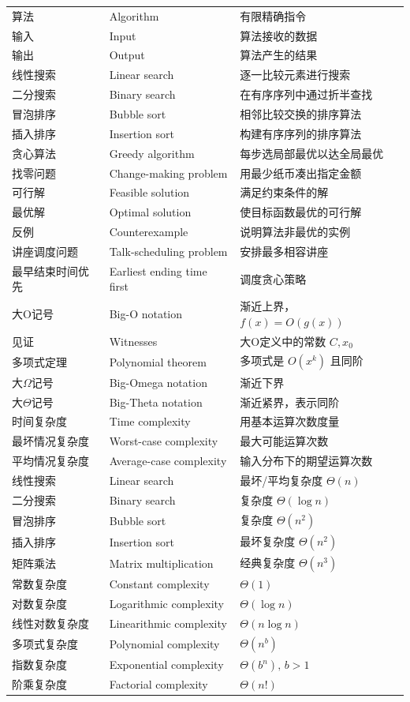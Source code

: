 \documentclass[UTF8,11pt,a4paper]{ctexbook}   %
\theoremstyle{definition}
\begin{document}
\begin{longtable}{|p{4.8cm}|p{4.8cm}|p{4.8cm}|}
算法 & Algorithm & 有限精确指令 \\
输入 & Input & 算法接收的数据 \\
输出 & Output & 算法产生的结果 \\
线性搜索 & Linear search & 逐一比较元素进行搜索 \\
二分搜索 & Binary search & 在有序序列中通过折半查找 \\
冒泡排序 & Bubble sort & 相邻比较交换的排序算法 \\
插入排序 & Insertion sort & 构建有序序列的排序算法 \\
贪心算法 & Greedy algorithm & 每步选局部最优以达全局最优 \\
找零问题 & Change-making problem & 用最少纸币凑出指定金额 \\
可行解 & Feasible solution & 满足约束条件的解 \\
最优解 & Optimal solution & 使目标函数最优的可行解 \\
反例 & Counterexample & 说明算法非最优的实例 \\
讲座调度问题 & Talk-scheduling problem & 安排最多相容讲座 \\
最早结束时间优先 & Earliest ending time first & 调度贪心策略 \\
\hline
大O记号 & Big-O notation & 渐近上界，$f(x)=O(g(x))$ \\
见证 & Witnesses & 大O定义中的常数 $C,x_0$ \\
多项式定理 & Polynomial theorem & 多项式是 $O(x^k)$ 且同阶 \\
大$\Omega$记号 & Big-Omega notation & 渐近下界 \\
大$\Theta$记号 & Big-Theta notation & 渐近紧界，表示同阶 \\
时间复杂度 & Time complexity & 用基本运算次数度量 \\
最坏情况复杂度 & Worst-case complexity & 最大可能运算次数 \\
平均情况复杂度 & Average-case complexity & 输入分布下的期望运算次数 \\
线性搜索 & Linear search & 最坏/平均复杂度 $\Theta(n)$ \\
二分搜索 & Binary search & 复杂度 $\Theta(\log n)$ \\
冒泡排序 & Bubble sort & 复杂度 $\Theta(n^2)$ \\
插入排序 & Insertion sort & 最坏复杂度 $\Theta(n^2)$ \\
矩阵乘法 & Matrix multiplication & 经典复杂度 $\Theta(n^3)$ \\
常数复杂度 & Constant complexity & $\Theta(1)$ \\
对数复杂度 & Logarithmic complexity & $\Theta(\log n)$ \\
线性对数复杂度 & Linearithmic complexity & $\Theta(n \log n)$ \\
多项式复杂度 & Polynomial complexity & $\Theta(n^b)$ \\
指数复杂度 & Exponential complexity & $\Theta(b^n),\, b>1$ \\
阶乘复杂度 & Factorial complexity & $\Theta(n!)$ \\
\end{longtable}
\end{document}
